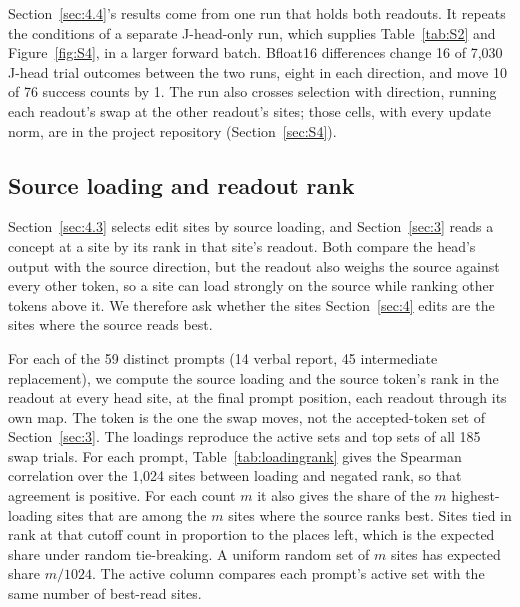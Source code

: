 \documentclass[11pt,a4paper]{article}
\begin{document}
Section~\ref{sec:4.4}'s results come from one run that holds both readouts. It repeats the conditions of a separate J-head-only run, which supplies Table~\ref{tab:S2} and Figure~\ref{fig:S4}, in a larger forward batch. Bfloat16 differences change 16 of 7,030 J-head trial outcomes between the two runs, eight in each direction, and move 10 of 76 success counts by 1. The run also crosses selection with direction, running each readout's swap at the other readout's sites; those cells, with every update norm, are in the project repository (Section~\ref{sec:S4}).

\subsection{Source loading and readout rank}\label{sec:S3.6}

Section~\ref{sec:4.3} selects edit sites by source loading, and Section~\ref{sec:3} reads a concept at a site by its rank in that site's readout. Both compare the head's output with the source direction, but the readout also weighs the source against every other token, so a site can load strongly on the source while ranking other tokens above it. We therefore ask whether the sites Section~\ref{sec:4} edits are the sites where the source reads best.

For each of the 59 distinct prompts (14 verbal report, 45 intermediate replacement), we compute the source loading and the source token's rank in the readout at every head site, at the final prompt position, each readout through its own map. The token is the one the swap moves, not the accepted-token set of Section~\ref{sec:3}. The loadings reproduce the active sets and top sets of all 185 swap trials. For each prompt, Table~\ref{tab:loadingrank} gives the Spearman correlation over the 1,024 sites between loading and negated rank, so that agreement is positive. For each count $m$ it also gives the share of the $m$ highest-loading sites that are among the $m$ sites where the source ranks best. Sites tied in rank at that cutoff count in proportion to the places left, which is the expected share under random tie-breaking. A uniform random set of $m$ sites has expected share $m/1024$. The active column compares each prompt's active set with the same number of best-read sites.
\end{document}
